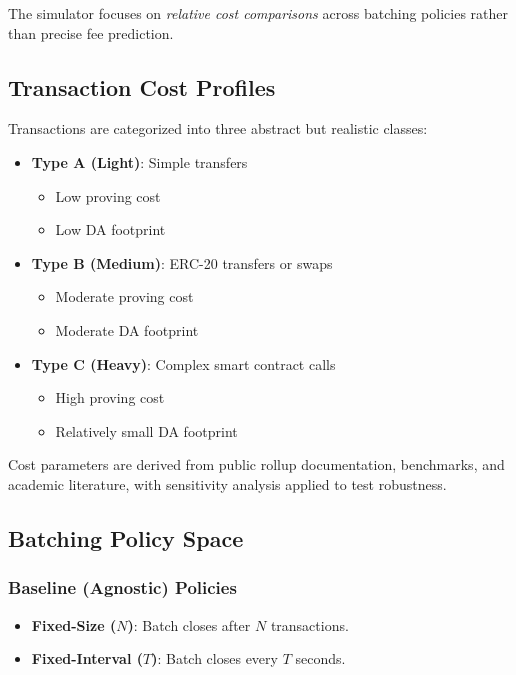 The simulator focuses on \emph{relative cost comparisons} across batching policies rather than precise fee prediction.

\subsection{Transaction Cost Profiles}

Transactions are categorized into three abstract but realistic classes:

\begin{itemize}[leftmargin=1.5em]
    \item \textbf{Type A (Light)}: Simple transfers
    \begin{itemize}
        \item Low proving cost
        \item Low DA footprint
    \end{itemize}

    \item \textbf{Type B (Medium)}: ERC-20 transfers or swaps
    \begin{itemize}
        \item Moderate proving cost
        \item Moderate DA footprint
    \end{itemize}

    \item \textbf{Type C (Heavy)}: Complex smart contract calls
    \begin{itemize}
        \item High proving cost
        \item Relatively small DA footprint
    \end{itemize}
\end{itemize}

Cost parameters are derived from public rollup documentation, benchmarks, and academic literature, with sensitivity analysis applied to test robustness.

\subsection{Batching Policy Space}

\subsubsection{Baseline (Agnostic) Policies}

\begin{itemize}[leftmargin=1.5em]
    \item \textbf{Fixed-Size ($N$)}: Batch closes after $N$ transactions.
    \item \textbf{Fixed-Interval ($T$)}: Batch closes every $T$ seconds.
\end{itemize}

